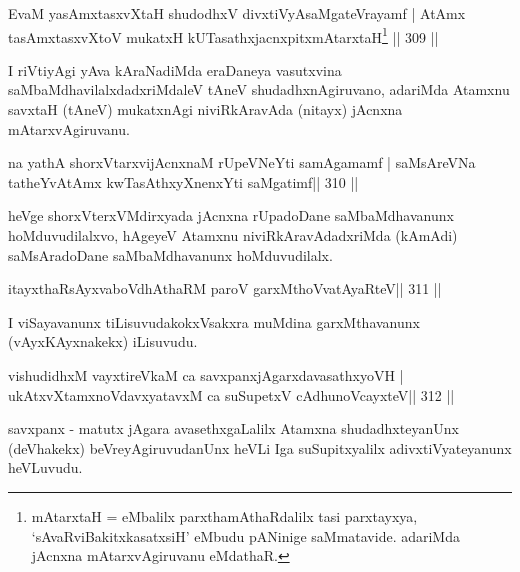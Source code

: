 \begin{shl}
EvaM yasAmxtasxvXtaH shudodhxV divxtiVyAsaMgateVrayamf |
AtAmx tasAmxtasxvXtoV mukatxH kUTasathxjacnxpitxmAtarxtaH\footnote{mAtarxtaH = eMbalilx parxthamAthaRdalilx tasi parxtayxya, `sAvaRviBakitxkasatxsiH' eMbudu pANinige saMmatavide. adariMda jAcnxna mAtarxvAgiruvanu eMdathaR.} \hfill || 309 ||
\end{shl}

\begin{artha}
I riVtiyAgi yAva kAraNadiMda eraDaneya vasutxvina saMbaMdhavilalxdadxriMdaleV tAneV shudadhxnAgiruvano, adariMda Atamxnu savxtaH (tAneV) mukatxnAgi niviRkAravAda (nitayx) jAcnxna mAtarxvAgiruvanu.
\end{artha}

\begin{shl}
na yathA shorxVtarxvijAcnxnaM rUpeVNeYti samAgamamf |
saMsAreVNa tatheYvA\s\s tAmx kwTasAthxyXnenxYti saMgatimf\hfill || 310 ||
\end{shl}

\begin{artha}
heVge shorxVterxVMdirxyada jAcnxna rUpadoDane saMbaMdhavanunx hoMduvudilalxvo, hAgeyeV Atamxnu niviRkAravAdadxriMda (kAmAdi) saMsAradoDane saMbaMdhavanunx hoMduvudilalx.
\end{artha}

\begin{shl}
itayxthaRsAyxvaboVdhAthaRM paroV garxMthoV\s vatAyaRteV\hfill || 311 ||
\end{shl}

\begin{artha}
I viSayavanunx tiLisuvudakokxVsakxra muMdina garxMthavanunx (vAyxKAyxnakekx) iLisuvudu.
\end{artha}

\begin{shl}
vishudidhxM vayxtireVkaM ca savxpanxjAgarxdavasathxyoVH |
ukAtxvX\s\s tamxnoV\s davxyatavxM ca suSupetxV cAdhunoVcayxteV\hfill || 312 ||
\end{shl}

\begin{artha}
savxpanx - matutx jAgara avasethxgaLalilx Atamxna shudadhxteyanUnx 
(deVhakekx) beVreyAgiruvudanUnx heVLi Iga suSupitxyalilx adivxtiVyateyanunx heVLuvudu.
\end{artha}


